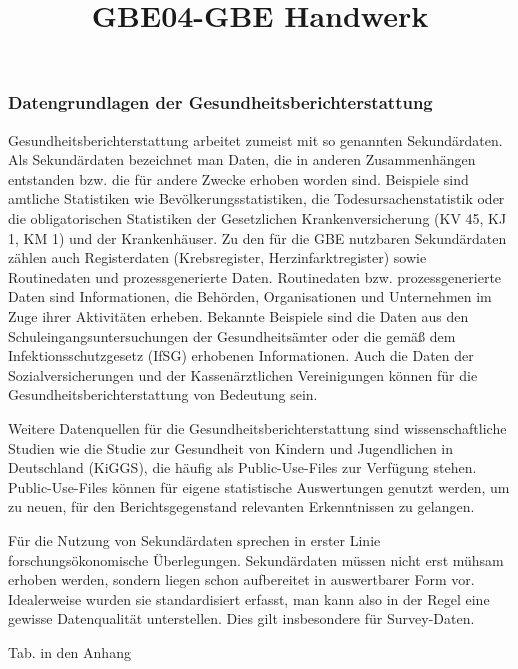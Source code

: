 \documentclass{article}
\begin{document}
\title{GBE04-GBE Handwerk}

\maketitle





\subsubsection{\textbf{Datengrundlagen der Gesundheitsberichterstattung}}\label{H2929607}



Gesundheitsberichterstattung arbeitet zumeist mit so genannten Sekundärdaten. Als Sekundärdaten bezeichnet man Daten, die in anderen Zusammenhängen entstanden bzw. die für andere Zwecke erhoben worden sind. Beispiele sind amtliche Statistiken wie Bevölkerungsstatistiken, die Todesursachenstatistik oder die obligatorischen Statistiken der Gesetzlichen Krankenversicherung (KV 45, KJ 1, KM 1) und der Krankenhäuser. Zu den für die GBE nutzbaren Sekundärdaten zählen auch Registerdaten (Krebsregister, Herzinfarktregister) sowie Routinedaten und prozessgenerierte Daten. Routinedaten bzw. prozessgenerierte Daten sind Informationen, die Behörden, Organisationen und Unternehmen im Zuge ihrer Aktivitäten erheben. Bekannte Beispiele sind die Daten aus den Schuleingangsuntersuchungen der Gesundheitsämter oder die gemäß dem Infektionsschutzgesetz (IfSG) erhobenen Informationen. Auch die Daten der Sozialversicherungen und der Kassenärztlichen Vereinigungen können für die Gesundheitsberichterstattung von Bedeutung sein. 


 Weitere Datenquellen für die Gesundheitsberichterstattung sind wissenschaftliche Studien wie die Studie zur Gesundheit von Kindern und Jugendlichen in Deutschland (KiGGS), die häufig als Public-Use-Files zur Verfügung stehen. Public-Use-Files können für eigene statistische Auswertungen genutzt werden, um zu neuen, für den Berichtsgegenstand relevanten Erkenntnissen zu gelangen. 


Für die Nutzung von Sekundärdaten sprechen in erster Linie forschungsökonomische Überlegungen. Sekundärdaten müssen nicht erst mühsam erhoben werden, sondern liegen schon aufbereitet in auswertbarer Form vor. Idealerweise wurden sie standardisiert erfasst, man kann also in der Regel eine gewisse Datenqualität unterstellen. Dies gilt insbesondere für Survey-Daten.


Tab. in den Anhang
\end{document}
